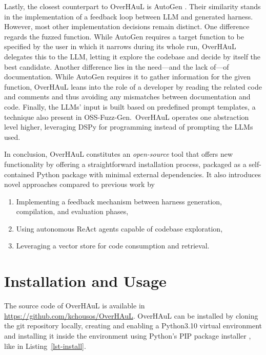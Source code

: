 \documentclass[
  a4paper,
]{scrreprt}
\providecommand{\tightlist}{%
  \setlength{\itemsep}{0pt}\setlength{\parskip}{0pt}}
\theoremstyle{definition}
\theoremstyle{remark}
\begin{document}
Lastly, the closest counterpart to OverHAuL is AutoGen
\autocite{sun2024}. Their similarity stands in the implementation of a
feedback loop between LLM and generated harness. However, most other
implementation decisions remain distinct. One difference regards the
fuzzed function. While AutoGen requires a target function to be
specified by the user in which it narrows during its whole run, OverHAuL
delegates this to the LLM, letting it explore the codebase and decide by
itself the best candidate. Another difference lies in the need---and the
lack of---of documentation. While AutoGen requires it to gather
information for the given function, OverHAuL leans into the role of a
developer by reading the related code and comments and thus avoiding any
mismatches between documentation and code. Finally, the LLMs' input is
built based on predefined prompt templates, a technique also present in
OSS-Fuzz-Gen.~OverHAuL operates one abstraction level higher, leveraging
DSPy \autocite{dspy} for programming instead of prompting the LLMs used.

In conclusion, OverHAuL constitutes an \emph{open-source} tool that
offers new functionality by offering a straightforward installation
process, packaged as a self-contained Python package with minimal
external dependencies. It also introduces novel approaches compared to
previous work by

\begin{enumerate}
\def\labelenumi{\arabic{enumi}.}
\tightlist
\item
  Implementing a feedback mechanism between harness generation,
  compilation, and evaluation phases,
\item
  Using autonomous ReAct agents capable of codebase exploration,
\item
  Leveraging a vector store for code consumption and retrieval.
\end{enumerate}

\section{Installation and Usage}\label{sec-install}

The source code of OverHAuL is available in
\url{https://github.com/kchousos/OverHAuL}. OverHAuL can be installed by
cloning the git repository locally, creating and enabling a Python3.10
virtual environment \autocite{venv} and installing it inside the
environment using Python's PIP package installer \autocite{pip}, like in
Listing~\ref{lst-install}.
\end{document}
